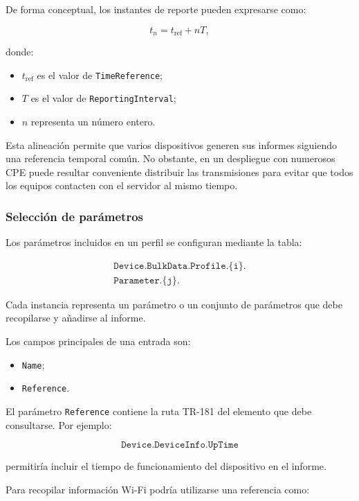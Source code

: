 De forma conceptual, los instantes de reporte pueden expresarse como:

\[
    t_n =
    t_{\mathrm{ref}}
    +
    nT,
\]

donde:

\begin{itemize}
    \item \(t_{\mathrm{ref}}\) es el valor de
    \texttt{TimeReference};
    \item \(T\) es el valor de \texttt{ReportingInterval};
    \item \(n\) representa un número entero.
\end{itemize}

Esta alineación permite que varios dispositivos generen sus informes
siguiendo una referencia temporal común. No obstante, en un despliegue
con numerosos CPE puede resultar conveniente distribuir las
transmisiones para evitar que todos los equipos contacten con el servidor
al mismo tiempo.


\subsubsection*{Selección de parámetros}

Los parámetros incluidos en un perfil se configuran mediante la tabla:

\[
\begin{split}
    \texttt{Device.BulkData.Profile.\{i\}.}\\
    \texttt{Parameter.\{j\}.}
\end{split}
\]

Cada instancia representa un parámetro o un conjunto de parámetros que
debe recopilarse y añadirse al informe.

Los campos principales de una entrada son:

\begin{itemize}
    \item \texttt{Name};
    \item \texttt{Reference}.
\end{itemize}

El parámetro \texttt{Reference} contiene la ruta TR-181 del elemento que
debe consultarse. Por ejemplo:

\[
    \texttt{Device.DeviceInfo.UpTime}
\]

permitiría incluir el tiempo de funcionamiento del dispositivo en el
informe.

Para recopilar información Wi-Fi podría utilizarse una referencia como:


